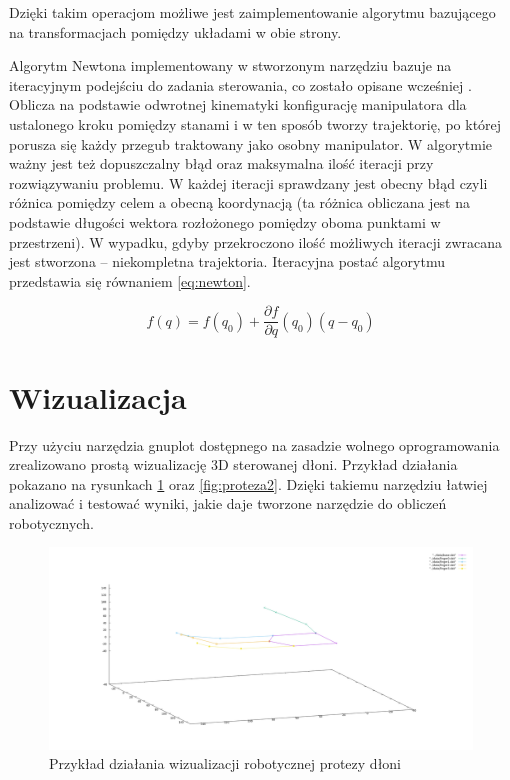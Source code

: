\documentclass[polish,polish]{article}
\begin{document}
Dzięki takim operacjom możliwe jest zaimplementowanie algorytmu bazującego na transformacjach pomiędzy układami w obie strony.

Algorytm Newtona implementowany w stworzonym narzędziu bazuje na iteracyjnym podejściu do zadania sterowania, co zostało opisane wcześniej \cite{kumar2015inverse}. 
Oblicza na podstawie odwrotnej kinematyki konfigurację manipulatora dla ustalonego kroku pomiędzy stanami i w ten sposób tworzy trajektorię, po której porusza się każdy przegub traktowany jako osobny manipulator. 
W algorytmie ważny jest też dopuszczalny błąd oraz maksymalna ilość iteracji przy rozwiązywaniu problemu.
W każdej iteracji sprawdzany jest obecny błąd czyli różnica pomiędzy celem a obecną koordynacją (ta różnica obliczana jest na podstawie długości wektora rozłożonego pomiędzy oboma punktami w przestrzeni).
W wypadku, gdyby przekroczono ilość możliwych iteracji zwracana jest stworzona -- niekompletna trajektoria.
Iteracyjna postać algorytmu przedstawia się równaniem \ref{eq:newton}.

\begin{equation}
f(q) = f(q_{0}) + \frac{\partial f}{\partial q}(q_{0})(q - q_{0})
\label{eq:newton}
\end{equation}

\newpage
\section{Wizualizacja}

Przy użyciu narzędzia gnuplot dostępnego na zasadzie wolnego oprogramowania zrealizowano prostą wizualizację 3D sterowanej dłoni.
Przykład działania pokazano na rysunkach \ref{fig:proteza} oraz \ref{fig:proteza2}.
Dzięki takiemu narzędziu łatwiej analizować i testować wyniki, jakie daje tworzone narzędzie do obliczeń robotycznych.

\begin{figure}[H]
\centering
\includegraphics[width=.7\textwidth]{plot.png} 
\caption{Przykład działania wizualizacji robotycznej protezy dłoni}
\label{fig:proteza}
\end{figure}
\end{document}
